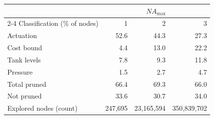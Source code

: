 \begin{tabular}{@{}lrrr@{}}
  \hline
   & \multicolumn{3}{c}{$NA_{\max}$} \\
  \cline{2-4}
  Classification (\% of nodes) & 1 & 2 & 3 \\
  \hline
  Actuation & 52.6 & 44.3 & 27.3 \\
  Cost bound & 4.4 & 13.0 & 22.2 \\
  Tank levels & 7.8 & 9.3 & 11.8 \\
  Pressure & 1.5 & 2.7 & 4.7 \\
  Total pruned & 66.4 & 69.3 & 66.0 \\
  Not pruned & 33.6 & 30.7 & 34.0 \\
  \hline
  Explored nodes (count) & 247{,}695 & 23{,}165{,}594 & 350{,}839{,}702 \\
  \hline
\end{tabular}
